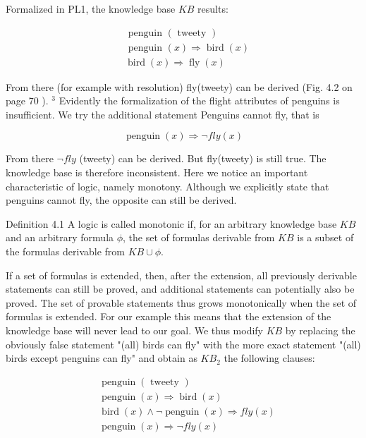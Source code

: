 \documentclass[10pt]{book}
\begin{document}
Formalized in PL1, the knowledge base $K B$ results:

$$
\begin{aligned}
& \text { penguin }(\text { tweety }) \\
& \text { penguin }(x) \Rightarrow \operatorname{bird}(x) \\
& \operatorname{bird}(x) \Rightarrow \operatorname{fly}(x)
\end{aligned}
$$

From there (for example with resolution) fly(tweety) can be derived (Fig. 4.2 on page 70 ). ${ }^{3}$ Evidently the formalization of the flight attributes of penguins is insufficient. We try the additional statement Penguins cannot fly, that is

$$
\operatorname{penguin}(x) \Rightarrow \neg f l y(x)
$$

From there $\neg f l y$ (tweety) can be derived. But fly(tweety) is still true. The knowledge base is therefore inconsistent. Here we notice an important characteristic of logic, namely monotony. Although we explicitly state that penguins cannot fly, the opposite can still be derived.

Definition 4.1 A logic is called monotonic if, for an arbitrary knowledge base $K B$ and an arbitrary formula $\phi$, the set of formulas derivable from $K B$ is a subset of the formulas derivable from $K B \cup \phi$.

If a set of formulas is extended, then, after the extension, all previously derivable statements can still be proved, and additional statements can potentially also be proved. The set of provable statements thus grows monotonically when the set of formulas is extended. For our example this means that the extension of the knowledge base will never lead to our goal. We thus modify $K B$ by replacing the obviously false statement "(all) birds can fly" with the more exact statement "(all) birds except penguins can fly" and obtain as $K B_{2}$ the following clauses:

$$
\begin{aligned}
& \operatorname{penguin}(\text { tweety }) \\
& \operatorname{penguin}(x) \Rightarrow \operatorname{bird}(x) \\
& \operatorname{bird}(x) \wedge \neg \operatorname{penguin}(x) \Rightarrow f l y(x) \\
& \operatorname{penguin}(x) \Rightarrow \neg f l y(x)
\end{aligned}
$$
\end{document}
